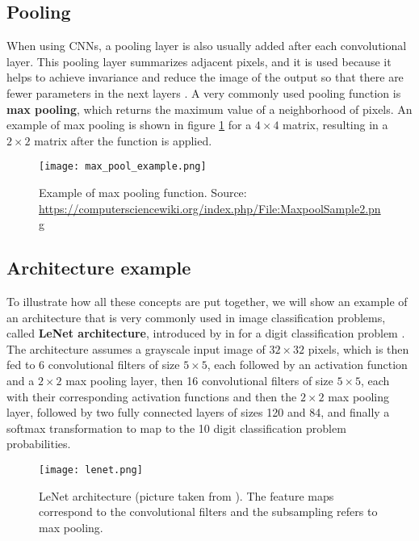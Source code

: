 \subsection{Pooling}

When using CNNs, a pooling layer is also usually added after each convolutional layer. This pooling layer summarizes adjacent pixels, and it is used because it helps to achieve invariance and reduce the image of the output so that there are fewer parameters in the next layers \cite{bengio2015deep}. A very commonly used pooling function is \textbf{max pooling}, which returns the maximum value of a neighborhood of pixels. An example of max pooling is shown in figure \ref{fig:max_pool_example} for a $4 \times 4$ matrix, resulting in a $2 \times 2$ matrix after the function is applied.

\begin{figure}[H]
    \centering
    \texttt{[image: max\_pool\_example.png]}
    \caption{Example of max pooling function. Source: \url{https://computersciencewiki.org/index.php/File:MaxpoolSample2.png}}
    \label{fig:max_pool_example}
\end{figure}


\subsection{Architecture example}

To illustrate how all these concepts are put together, we will show an example of an architecture that is very commonly used in image classification problems, called \textbf{LeNet architecture}, introduced by \citeauthor{lecun1998gradient} in \citeyear{lecun1998gradient} for a digit classification problem \cite{lecun1998gradient}. The architecture assumes a grayscale input image of $32 \times 32$ pixels, which is then fed to 6 convolutional filters of size $5 \times 5$, each followed by an activation function and a $2 \times 2$ max pooling layer, then 16 convolutional filters of size $5 \times 5$, each with their corresponding activation functions and then the $2 \times 2$ max pooling layer, followed by two fully connected layers of sizes 120 and 84, and finally a softmax transformation to map to the 10 digit classification problem probabilities.

\begin{figure}[H]
    \centering
    \texttt{[image: lenet.png]}
    \caption{LeNet architecture (picture taken from \cite{lecun1998gradient}). The feature maps correspond to the convolutional filters and the subsampling refers to max pooling.}
    \label{fig:lenet_architecture}
\end{figure}



